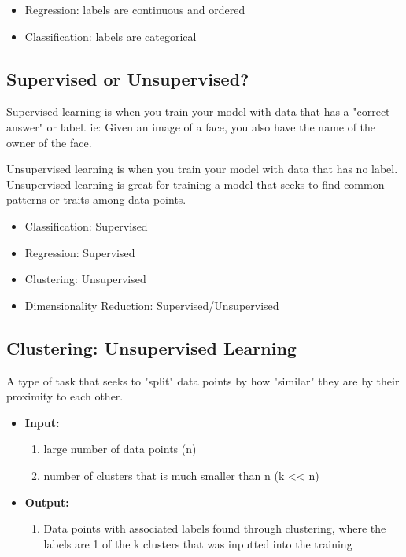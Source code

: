 \documentclass[11pt]{article}
\begin{document}
\begin{itemize}
\item Regression: labels are continuous and ordered
\item Classification: labels are categorical
\end{itemize}


\subsection{Supervised or Unsupervised?}
\label{sec:orga98606b}

Supervised learning is when you train your model with data that has a "correct answer" or label. ie: Given an image of a face, you also have the name of the owner of the face.

Unsupervised learning is when you train your model with data that has no label. Unsupervised learning is great for training a model that seeks to find common patterns or traits among data points.


\begin{itemize}
\item Classification: Supervised
\item Regression: Supervised
\item Clustering: Unsupervised
\item Dimensionality Reduction: Supervised/Unsupervised
\end{itemize}

\subsection{Clustering: Unsupervised Learning}
\label{sec:orgc042269}

A type of task that seeks to "split" data points by how "similar" they are by their proximity to each other.

\begin{itemize}
\item \textbf{\textbf{Input:}}
\begin{enumerate}
\item large number of data points (n)
\item number of clusters that is much smaller than n (k << n)
\end{enumerate}

\item \textbf{\textbf{Output:}}
\begin{enumerate}
\item Data points with associated labels found through clustering, where the labels are 1 of the k clusters that was inputted into the training
\end{enumerate}
\end{itemize}
\end{document}
